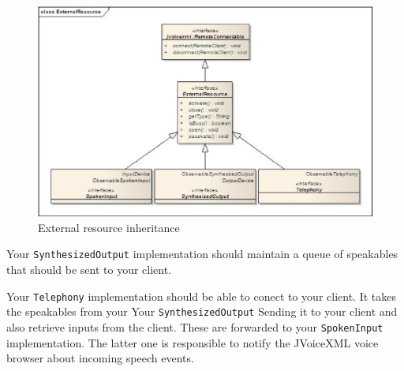 \documentclass[11pt,a4paper]{article}
\begin{document}
\begin{figure}[htp]
\begin{center}
  \includegraphics[width=\linewidth]{class-external-resource}
  \caption{External resource inheritance}
  \label{fig:external-resource}
\end{center}
\end{figure}

Your \lstinline[language=Java]{SynthesizedOutput} implementation should maintain
a queue of speakables that should be sent to your client.

Your \lstinline[language=Java]{Telephony} implementation should be able to
conect to your client. It takes the speakables from your Your
\lstinline[language=Java]{SynthesizedOutput} Sending it to your client and also
retrieve inputs from the client. These are forwarded to your 
\lstinline[language=Java]{SpokenInput} implementation. The latter one is
responsible to notify the JVoiceXML voice browser about incoming speech events.
\end{document}
